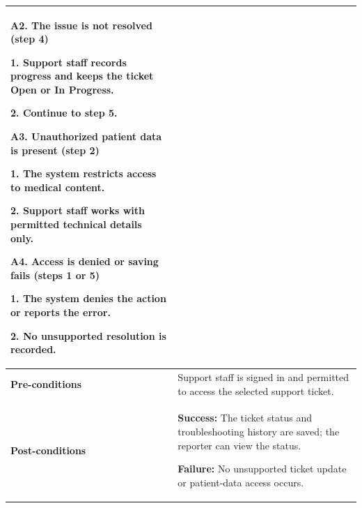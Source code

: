 \begin{longtable}{|p{}|p{}|}
\par\smallskip
\textbf{A2. The issue is not resolved (step 4)}\par
1. Support staff records progress and keeps the ticket Open or In Progress.\par
2. Continue to step 5.
\par\smallskip
\textbf{A3. Unauthorized patient data is present (step 2)}\par
1. The system restricts access to medical content.\par
2. Support staff works with permitted technical details only.
\par\smallskip
\textbf{A4. Access is denied or saving fails (steps 1 or 5)}\par
1. The system denies the action or reports the error.\par
2. No unsupported resolution is recorded.
\\ \hline
\textbf{Pre-conditions} & Support staff is signed in and permitted to access the selected support ticket. \\ \hline
\textbf{Post-conditions} & \textbf{Success:} The ticket status and troubleshooting history are saved; the reporter can view the status.\par
\textbf{Failure:} No unsupported ticket update or patient-data access occurs. \\ \hline
\end{longtable}
